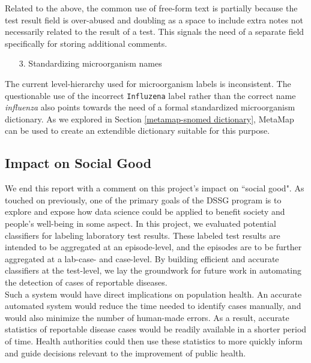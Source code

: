 \documentclass[11pt]{article}
\begin{document}
Related to the above, the common use of free-form text is partially because the test result field is over-abused and doubling as a space to include extra notes not necessarily related to the result of a test. This signals the need of a separate field specifically for storing additional comments.

\begin{enumerate}

\item[3.]
Standardizing microorganism names

\end{enumerate}

The current level-hierarchy used for microorganism labels is inconsistent. The questionable use of the incorrect \verb|Influzena| label rather than the correct name \textit{influenza} also points towards the need of a formal standardized microorganism dictionary. As we explored in Section \ref{metamap-snomed dictionary}, MetaMap can be used to create an extendible dictionary suitable for this purpose.


\subsection{Impact on Social Good} \label{impact on social good}

We end this report with a comment on this project's impact on ``social good". As touched on previously, one of the primary goals of the DSSG program is to explore and expose how data science could be applied to benefit society and people's well-being in some aspect. In this project, we evaluated potential classifiers for labeling laboratory test results. These labeled test results are intended to be aggregated at an episode-level, and the episodes are to be further aggregated at a lab-case- and case-level. By building efficient and accurate classifiers at the test-level, we lay the groundwork for future work in automating the detection of cases of reportable diseases.
\\

Such a system would have direct implications on population health. An accurate automated system would reduce the time needed to identify cases manually, and would also minimize the number of human-made errors. As a result, accurate statistics of reportable disease cases would be readily available in a shorter period of time. Health authorities could then use these statistics to more quickly inform and guide decisions relevant to the improvement of public health.
\end{document}
